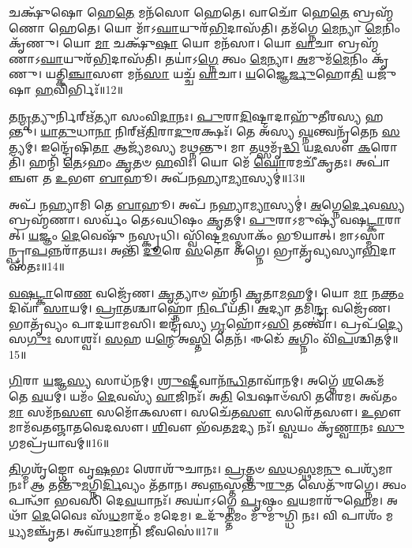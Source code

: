 𑌚𑌕𑍍𑌷𑍁᳴𑌷𑍋 𑌹𑍇\-\ul{𑌤𑍇} 𑌮𑌨᳴𑌸𑍋 𑌹𑍇𑌤𑍇।
𑌵𑌾𑌚𑍋᳴ 𑌹𑍇\-\ul{𑌤𑍇} 𑌬𑍍𑌰𑌹𑍍𑌮᳴𑌣𑍋 𑌹𑍇𑌤𑍇।
𑌯𑍋 𑌮𑌾᳴\-𑌽\-\ul{𑌘𑌾}\-𑌯𑍁𑌰᳴\-\ul{𑌭𑌿}\-𑌦𑌾𑌸᳴𑌤𑌿।
𑌤𑌮᳴𑌗𑍍𑌨𑍇 \ul{𑌮𑍇}\-𑌨𑍍𑌯𑌾 \ul{𑌮𑍇}\-𑌨𑌿𑌂 𑌕𑍃᳴𑌣𑍁।
𑌯𑍋 \ul{𑌮𑌾} 𑌚𑌕𑍍𑌷𑍁᳴\-\ul{𑌷𑌾} 𑌯𑍋 𑌮𑌨᳴𑌸𑌾।
𑌯𑍋 \ul{𑌵𑌾}\-𑌚𑌾 𑌬𑍍𑌰𑌹𑍍𑌮᳴𑌣𑌾\-𑌽\-\ul{𑌘𑌾}\-𑌯𑍁𑌰᳴\-\ul{𑌭𑌿}\-𑌦𑌾𑌸᳴𑌤𑌿।
𑌤𑌯𑌾॑𑌽\-\ul{𑌗𑍍𑌨𑍇} 𑌤𑍍𑌵𑌂 \ul{𑌮𑍇}\-𑌨𑍍𑌯𑌾।
\-\ul{𑌅}\-𑌮𑍁𑌮᳴\-\ul{𑌮𑍇}\-𑌨𑌿𑌂 𑌕𑍃᳴𑌣𑍁।
𑌯𑌤𑍍𑌕𑌿\-\ul{𑌞𑍍𑌚𑌾}\-𑌸𑍗 𑌮𑌨᳴\-\ul{𑌸𑌾} 𑌯𑌚𑍍𑌚᳴ \ul{𑌵𑌾}\-𑌚𑌾।
\-\ul{𑌯}\-𑌜𑍍𑌞𑍈\-\ul{𑌰𑍍𑌜𑍁}\-𑌹𑍋\-\ul{𑌤𑌿} 𑌯𑌜𑍁᳴𑌷𑌾 \ul{𑌹}\-𑌵𑌿𑌰𑍍𑌭𑌿𑌃᳴॥12॥

𑌤\-\ul{𑌨𑍍𑌮𑍃}\-𑌤𑍍𑌯𑍁𑌰𑍍𑌨𑌿𑌰𑍍\mbox{}𑌋᳴𑌤𑍍𑌯𑌾 𑌸𑌂𑌵𑌿\-\ul{𑌦𑌾}\-𑌨𑌃।
\-\ul{𑌪𑍁}\-𑌰𑌾\-\ul{𑌦𑌿}\-𑌷𑍍𑌟𑌾𑌦𑌾𑌹𑍁᳴𑌤𑍀𑌰𑌸𑍍𑌯 𑌹𑌨𑍍𑌤𑍁।
\-\ul{𑌯𑌾}\-\-\ul{𑌤𑍁}\-𑌧𑌾\-\ul{𑌨𑌾} 𑌨𑌿𑌰𑍍\mbox{}𑌋᳴\-\ul{𑌤𑌿}\-𑌰𑌾\-\ul{𑌦𑍁}\-𑌰𑌕𑍍𑌷𑌃᳴।
𑌤𑍇 𑌅᳴𑌸𑍍𑌯 \ul{𑌘𑍍𑌨}\-𑌨𑍍𑌤𑍍𑌵𑌨𑍃᳴𑌤𑍇𑌨 \ul{𑌸}\-𑌤𑍍𑌯𑌮𑍍।
𑌇𑌨𑍍𑌦𑍍𑌰𑍇᳴𑌷𑌿\-\ul{𑌤𑌾} 𑌆𑌜𑍍𑌯᳴𑌮𑌸𑍍𑌯 𑌮𑌥𑍍𑌨𑌨𑍍𑌤𑍁।
𑌮𑌾 𑌤𑌥𑍍𑌸𑌮𑍃᳴\-\ul{𑌦𑍍𑌧𑌿} 𑌯\-\ul{𑌦}\-𑌸𑍗 \ul{𑌕}\-𑌰𑍋𑌤𑌿᳴।
𑌹𑌨𑍍𑌮𑌿᳴ \ul{𑌤𑍇}\-𑌽𑌹𑌂 \ul{𑌕𑍃}\-𑌤𑍞 \ul{𑌹}\-𑌵𑌿𑌃।
𑌯𑍋 𑌮𑍇᳴ \ul{𑌘𑍋}\-𑌰𑌮𑌚𑍀᳴𑌕𑍃𑌤𑌃।
𑌅𑌪𑌾॑𑌞𑍍𑌚𑍗 𑌤 \ul{𑌉}\-𑌭𑍗 \ul{𑌬𑌾}\-𑌹𑍂।
𑌅𑌪᳴𑌨𑌹𑍍𑌯𑌾\-\ul{𑌮𑍍𑌯𑌾}\-𑌸𑍍𑌯𑌮𑍍॑॥13॥

𑌅𑌪᳴ 𑌨𑌹𑍍𑌯𑌾𑌮𑌿 𑌤𑍇 \ul{𑌬𑌾}\-𑌹𑍂।
𑌅𑌪᳴ 𑌨𑌹𑍍𑌯𑌾\-\ul{𑌮𑍍𑌯𑌾}\-𑌸𑍍𑌯𑌮𑍍॑।
\-\ul{𑌅}\-𑌗𑍍𑌨𑍇\-\ul{𑌰𑍍𑌦𑍇}\-𑌵\-\ul{𑌸𑍍𑌯} 𑌬𑍍𑌰𑌹𑍍𑌮᳴𑌣𑌾।
𑌸𑌰𑍍𑌵𑌂᳴ 𑌤𑍇𑌽𑌵𑌧𑌿𑌷𑌂 \ul{𑌕𑍃}\-𑌤𑌮𑍍।
\-\ul{𑌪𑍁}\-𑌰𑌾\-𑌽𑌮𑍁𑌷𑍍𑌯᳴ 𑌵𑌷\-\ul{𑌟𑍍𑌕𑌾}\-𑌰𑌾𑌤𑍍।
\-\ul{𑌯}\-𑌜𑍍𑌞𑌂 \ul{𑌦𑍇}\-𑌵𑍇𑌷𑍁᳴ 𑌨𑌸𑍍𑌕𑍃𑌧𑌿।
𑌸𑍍𑌵𑌿᳴𑌷𑍍𑌟\-\ul{𑌮}\-𑌸𑍍𑌮𑌾𑌕𑌂᳴ 𑌭𑍂𑌯𑌾𑌤𑍍।
𑌮𑌾𑌽𑌸𑍍𑌮𑌾𑌨𑍍𑌪𑍍𑌰𑌾\-\ul{𑌪}\-𑌨𑍍𑌨\-𑌰𑌾᳴𑌤𑌯𑌃।
𑌅𑌨𑍍𑌤𑌿᳴ \ul{𑌦𑍂}\-𑌰𑍇 \ul{𑌸}\-𑌤𑍋 𑌅᳴𑌗𑍍𑌨𑍇।
𑌭𑍍𑌰𑌾𑌤𑍃᳴𑌵𑍍𑌯𑌸𑍍𑌯𑌾\-\ul{𑌭𑌿}\-𑌦𑌾𑌸᳴𑌤𑌃॥14॥

\-\ul{𑌵}\-\-\ul{𑌷}\-\-\ul{𑌟𑍍𑌕𑌾}\-𑌰𑍇\-\ul{𑌣} 𑌵𑌜𑍍𑌰𑍇᳴𑌣।
\-\ul{𑌕𑍃}\-𑌤𑍍𑌯𑌾𑍞 𑌹᳴𑌨𑍍𑌮𑌿 \ul{𑌕𑍃}\-𑌤𑌾\-\ul{𑌮}\-𑌹𑌮𑍍।
𑌯𑍋 \ul{𑌮𑌾} 𑌨\-\ul{𑌕𑍍𑌤𑌂} 𑌦𑌿𑌵𑌾᳴ \ul{𑌸𑌾}\-𑌯𑌮𑍍।
\-\ul{𑌪𑍍𑌰𑌾}\-𑌤𑌶𑍍𑌚𑌾𑌹𑍍𑌨𑍋᳴ \ul{𑌨𑌿}\-𑌪𑍀𑌯᳴𑌤𑌿।
\-\ul{𑌅}\-𑌦𑍍𑌯𑌾 𑌤𑌮𑌿᳴\-\ul{𑌨𑍍𑌦𑍍𑌰} 𑌵𑌜𑍍𑌰𑍇᳴𑌣।
𑌭𑌾𑌤𑍃᳴𑌵𑍍𑌯𑌂 𑌪𑌾𑌦𑌯𑌾𑌮𑌸𑌿।
𑌇𑌨𑍍𑌦𑍍𑌰᳴𑌸𑍍𑌯 \ul{𑌗𑍃}\-𑌹𑍋᳴𑌽\-\ul{𑌸𑌿} 𑌤𑌨𑍍𑌤𑍍𑌵𑌾॑।
𑌪𑍍𑌰𑌪᳴\-\ul{𑌦𑍍𑌯𑍇} 𑌸\-\ul{𑌗𑍁𑌃} 𑌸𑌾𑌶𑍍𑌵𑌃᳴।
\-\ul{𑌸}\-𑌹 𑌯\-\ul{𑌨𑍍𑌮𑍇} 𑌅\-\ul{𑌸𑍍𑌤𑌿} 𑌤𑍇𑌨᳴।
𑌈𑌡𑍇᳴ \ul{𑌅}\-𑌗𑍍𑌨𑌿𑌂 𑌵𑌿᳴\-\ul{𑌪}\-𑌶𑍍𑌚𑌿𑌤𑌮𑍍॑॥15॥

\-\ul{𑌗𑌿}\-𑌰𑌾 \ul{𑌯}\-𑌜𑍍𑌞\-\ul{𑌸𑍍𑌯} 𑌸𑌾𑌧᳴𑌨𑌮𑍍।
\-\ul{𑌶𑍍𑌰𑍁}\-\-\ul{𑌷𑍍𑌟𑍀}\-𑌵𑌾𑌨᳴\-\ul{𑌨𑍍𑌧𑌿}\-𑌤𑌾𑌵𑌾᳴𑌨𑌮𑍍।
𑌅𑌗𑍍𑌨𑍇᳴ \ul{𑌶}\-𑌕𑍇𑌮᳴ 𑌤𑍇 \ul{𑌵}\-𑌯𑌮𑍍।
𑌯𑌮𑌂᳴ \ul{𑌦𑍇}\-𑌵𑌸𑍍𑌯᳴ \ul{𑌵𑌾}\-𑌜𑌿𑌨𑌃᳴।
𑌅\-\ul{𑌤𑌿} 𑌦𑍍𑌵𑍇𑌷𑌾𑍞᳴𑌸𑌿 𑌤𑌰𑍇𑌮।
𑌅𑌵᳴𑌤𑌂 \ul{𑌮𑌾} 𑌸𑌮᳴𑌨\-\ul{𑌸𑍗} 𑌸𑌮𑍋᳴𑌕𑌸𑍗।
𑌸𑌚𑍇᳴𑌤\-\ul{𑌸𑍗} 𑌸𑌰𑍇᳴𑌤𑌸𑍗।
\-\ul{𑌉}\-𑌭𑍗 𑌮𑌾𑌮᳴𑌵𑌤𑌞𑍍𑌜𑌾𑌤𑌵𑍇𑌦𑌸𑍗।
\-\ul{𑌶𑌿}\-𑌵𑍗 𑌭᳴𑌵𑌤\-\ul{𑌮}\-𑌦𑍍𑌯 𑌨𑌃᳴।
\-\ul{𑌸𑍍𑌵}\-𑌯𑌂 𑌕𑍃᳴\-\ul{𑌣𑍍𑌵𑌾}\-𑌨𑌃 \ul{𑌸𑍁}\-𑌗𑌮𑌪𑍍𑌰᳴𑌯𑌾𑌵𑌮𑍍॥16॥

\-\ul{𑌤𑌿}\-𑌗𑍍𑌮𑌶𑍃᳴𑌙𑍍𑌗𑍋 𑌵𑍃\-\ul{𑌷}\-𑌭𑌃 𑌶𑍋𑌶𑍁᳴𑌚𑌾𑌨𑌃।
\-\ul{𑌪𑍍𑌰}\-𑌤𑍍𑌨𑍞 \ul{𑌸}\-𑌧\-\ul{𑌸𑍍𑌥}\-𑌮\-\ul{𑌨𑍁} 𑌪𑌶𑍍𑌯᳴𑌮𑌾𑌨𑌃।
𑌆 𑌤𑌨𑍍𑌤𑍁᳴\-\ul{𑌮}\-𑌗𑍍𑌨𑌿\-\ul{𑌰𑍍𑌦𑌿}\-𑌵𑍍𑌯𑌂 𑌤᳴𑌤𑌾𑌨।
𑌤𑍍𑌵\-\ul{𑌨𑍍𑌨}\-𑌸𑍍𑌤𑌨𑍍𑌤𑍁᳴\-\ul{𑌰𑍁}\-𑌤 𑌸𑍇𑌤𑍁᳴𑌰𑌗𑍍𑌨𑍇।
𑌤𑍍𑌵𑌂 𑌪𑌨𑍍𑌥𑌾᳴ 𑌭𑌵𑌸𑌿 𑌦𑍇\-\ul{𑌵}\-𑌯𑌾𑌨𑌃᳴।
𑌤𑍍𑌵𑌯𑌾॑\-𑌽𑌗𑍍𑌨𑍇 \ul{𑌪𑍃}\-𑌷𑍍𑌠𑌂 \ul{𑌵}\-𑌯𑌮𑌾𑌰𑍁᳴𑌹𑍇𑌮।
𑌅𑌥𑌾᳴ \ul{𑌦𑍇}\-𑌵𑍈𑌃 𑌸᳴\-\ul{𑌧}\-𑌮𑌾𑌦𑌂᳴ 𑌮𑌦𑍇𑌮।
𑌉𑌦𑍁᳴\-\ul{𑌤𑍍𑌤}\-𑌮𑌂 𑌮𑍁᳴𑌮𑍁𑌗𑍍𑌧𑌿 𑌨𑌃।
𑌵𑌿 𑌪𑌾𑌶𑌂᳴ 𑌮\-\ul{𑌧𑍍𑌯}\-𑌮𑌞𑍍𑌚𑍃᳴𑌤।
𑌅𑌵𑌾᳴\-\ul{𑌧}\-𑌮𑌾𑌨𑌿᳴ \ul{𑌜𑍀}\-𑌵𑌸𑍇॑॥17॥

